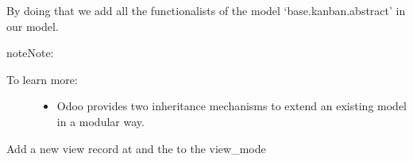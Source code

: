 \documentclass[letterpaper,10pt,english]{sphinxmanual}
\begin{document}
%
\begin{sphinxVerbatim}[commandchars=\\\{\}]
 

      
      
\end{sphinxVerbatim}
\sphinxresetverbatimhllines

By doing that we add all the functionalists of the model ‘base.kanban.abstract’ in our model.

\begin{sphinxadmonition}{note}{Note:}\begin{description}
\item[{To learn more:}] \leavevmode\begin{itemize}
\item {} 
Odoo provides two inheritance mechanisms to extend an existing model in a modular way. 

\end{itemize}

\end{description}
\end{sphinxadmonition}

Add a new view record at  and the  to the view\_mode
\end{document}
